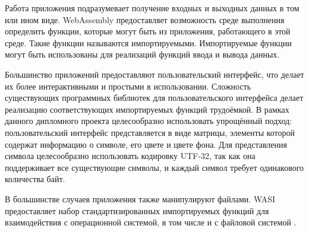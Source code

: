Работа приложения подразумевает получение входных и выходных данных в том или ином виде.
WebAssembly предоставляет возможность среде выполнения определить функции, которые могут быть из приложения, работающего в этой среде.
Такие функции называются импортируемыми.
Импортируемые функции могут быть использованы для реализаций функций ввода и вывода данных.

Большинство приложений предоставляют пользовательский интерфейс, что делает их более интерактивными и простыми в использовании.
Сложность существующих программных библиотек для пользовательского интерфейса делает реализацию соответствующих импортируемых функций трудоёмкой.
В рамках данного дипломного проекта целесообразно использовать упрощённый подход: пользовательский интерфейс представляется в виде матрицы, элементы которой содержат информацию о символе, его цвете и цвете фона.
Для представления символа целесообразно использовать кодировку UTF-32, так как она поддерживает все существующие символы, и каждый символ требует одинакового количества байт.

В большинстве случаев приложения также манипулируют файлами.
WASI предоставляет набор стандартизированных импортируемых функций для взаимодействия с операционной системой, в том числе и с файловой системой \cite{WASI}.

